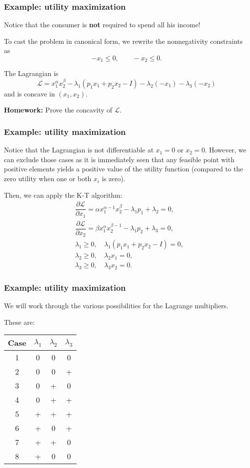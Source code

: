 \documentclass[10pt]{beamer}
\theoremstyle{definition}
\begin{document}
\begin{frame}[fragile]
\frametitle{Example: utility maximization}
Notice that the consumer is \textbf{not} required to spend all his income!\bigskip

To cast the problem in canonical form, we rewrite the nonnegativity constraints as
\[ -x_1\leq 0 , \qquad -x_2 \leq 0. \] \bigskip

The Lagrangian is \[ \mathcal{L} = x_1^\alpha x_2^\beta - \lambda_1 ( p_1 x_1 + p_2 x_2 - I) -\lambda_2 (-x_1) - \lambda_3 (-x_2) \] and is {\color{red}concave} in $ (x_1,x_2) $.\bigskip

\textbf{Homework:} Prove the concavity of $ \mathcal{L} $.
\end{frame}

\begin{frame}[fragile]
\frametitle{Example: utility maximization}
Notice that the Lagrangian is not differentiable at $ x_1=0 $ or $ x_2=0 $. However, we can exclude those cases as it is immediately seen that any feasible point with positive elements yields a positive value of the utility function (compared to the zero utility when one or both $ x_i $ is zero).\bigskip

Then, we can apply the K-T algorithm:\begin{align*}
&\dfrac{\partial \mathcal{L}}{\partial x_1} = \alpha x_1^{\alpha-1} x_2^\beta -\lambda_1 p_1 + \lambda_2 = 0, \\[4pt]
&\dfrac{\partial \mathcal{L}}{\partial x_2} = \beta x_1^\alpha x_2^{\beta-1} -\lambda_1 p_2 + \lambda_3 = 0, \\[4pt]
&\lambda_1 \geq 0, \quad \lambda_1 ( p_1 x_1 + p_2 x_2 - I) = 0, \\[4pt]
&\lambda_2 \geq 0, \quad \lambda_2 x_1 = 0, \\[4pt]
&\lambda_3 \geq 0, \quad \lambda_3 x_2 = 0. 
\end{align*}
\end{frame}

\begin{frame}[fragile]
\frametitle{Example: utility maximization}
We will work through the various possibilities for the Lagrange multipliers. 

These are:

\begin{center}
\begin{tabular}{|c|c|c|c|}
\hline 
Case & $ \lambda_1 $ & $ \lambda_2 $ & $ \lambda_3 $ \\ 
\hline 
1 & 0 & 0 & 0 \\ 
\hline 
2 & 0 & 0 & + \\ 
\hline 
3 & 0 & + & 0 \\ 
\hline 
4 & 0 & + & + \\ 
\hline 
5 & + & + & + \\ 
\hline 
6 & + & 0 & + \\ 
\hline 
7 & + & + & 0 \\ 
\hline 
8 & + & 0 & 0 \\ 
\hline 
\end{tabular} \end{center}
\end{frame}
\end{document}
